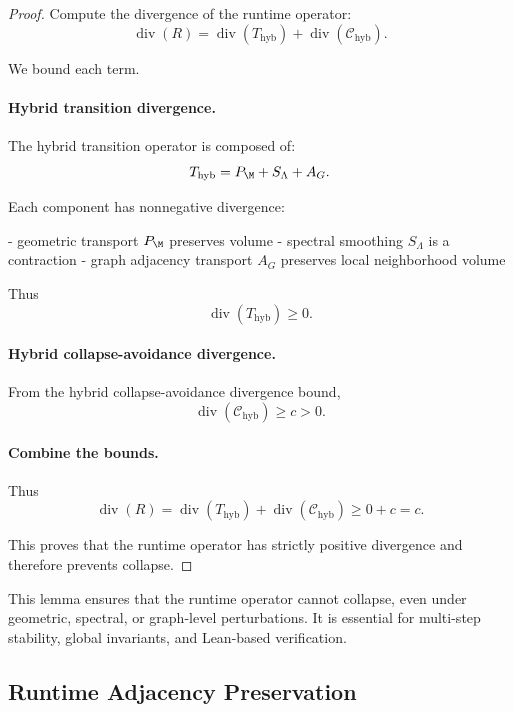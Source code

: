 \begin{proof}
Compute the divergence of the runtime operator:
\[
\operatorname{div}(R)
=
\operatorname{div}(T_{\mathrm{hyb}})
+
\operatorname{div}(\mathcal{C}_{\mathrm{hyb}}).
\]

We bound each term.

\paragraph{Hybrid transition divergence.}
The hybrid transition operator is composed of:
\[
T_{\mathrm{hyb}}
=
P_\M
+
S_\Lambda
+
A_G.
\]

Each component has nonnegative divergence:

- geometric transport $P_\M$ preserves volume  
- spectral smoothing $S_\Lambda$ is a contraction  
- graph adjacency transport $A_G$ preserves local neighborhood volume  

Thus
\[
\operatorname{div}(T_{\mathrm{hyb}}) \ge 0.
\]

\paragraph{Hybrid collapse-avoidance divergence.}
From the hybrid collapse-avoidance divergence bound,
\[
\operatorname{div}(\mathcal{C}_{\mathrm{hyb}}) \ge c > 0.
\]

\paragraph{Combine the bounds.}
Thus
\[
\operatorname{div}(R)
=
\operatorname{div}(T_{\mathrm{hyb}})
+
\operatorname{div}(\mathcal{C}_{\mathrm{hyb}})
\ge
0 + c
=
c.
\]

This proves that the runtime operator has strictly positive divergence and
therefore prevents collapse.
\end{proof}

\begin{remark}
This lemma ensures that the runtime operator cannot collapse, even under
geometric, spectral, or graph-level perturbations. It is essential for
multi-step stability, global invariants, and Lean-based verification.
\end{remark}



\subsection{Runtime Adjacency Preservation}

